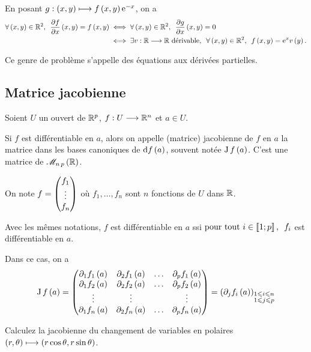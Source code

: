 \begin{corr}
En posant \(g:\left(x,y\right)\longmapsto f\left(x,y\right)\mathrm{e}^{-x}\), on a \[\begin{aligned}
\quantifs{\forall\paren{x,y}\in\R^2}\pdv{f}{x}\paren{x,y}=f\paren{x,y}&\ssi\quantifs{\forall\paren{x,y}\in\R^2}\pdv{g}{x}\paren{x,y}=0 \\
&\ssi\quantifs{\exists v:\R\to\R\text{ dérivable};\forall\paren{x,y}\in\R^2}f\paren{x,y}=\e{x}v\paren{y}.
\end{aligned}\]
\end{corr}

Ce genre de problème s'appelle des équations aux dérivées partielles.

\subsection{Matrice jacobienne}

\begin{defi}
Soient \(U\) un ouvert de \(\mathbb{R}^p\), \(f:U\longrightarrow\mathbb{R}^n\) et \(a\in U\).

Si \(f\) est différentiable en \(a\), alors on appelle (matrice) jacobienne de \(f\) en \(a\) la matrice dans les bases canoniques de \(\odif{f}\paren{a}\), souvent notée \(\operatorname{J}f\left(a\right)\). C'est une matrice de \(\M{n\,p}[\R]\).
\end{defi}

On note \(f=\begin{pmatrix}f_1\\\vdots\\f_n\end{pmatrix}\) où \(f_1,\dots,f_n\) sont \(n\) fonctions de \(U\) dans \(\mathbb{R}\).

\begin{prop}
Avec les mêmes notations, \(f\) est différentiable en \(a\) ssi \(\quantifs{\tpt i\in\interventierii{1}{p}}f_i\) est différentiable en \(a\).
\end{prop}

Dans ce cas, on a \[\jacobienne{f}\paren{a}=\begin{pmatrix}
\pdif{1}f_1\paren{a} & \pdif{2}f_1\paren{a} & \dots & \pdif{p}f_1\paren{a} \\
\pdif{1}f_2\paren{a} & \pdif{2}f_2\paren{a} & \dots & \pdif{p}f_2\paren{a} \\
\vdots & \vdots &  & \vdots \\
\pdif{1}f_n\paren{a} & \pdif{2}f_n\paren{a} & \dots & \pdif{p}f_n\paren{a}
\end{pmatrix}=\paren{\pdif{j}f_i\paren{a}}_{\substack{1\leq i\leq n \\ 1\leq j\leq p}}\]

\begin{exo}
Calculez la jacobienne du changement de variables en polaires \(\left(r,\theta\right)\longmapsto\left(r\cos\theta,r\sin\theta\right)\).
\end{exo}

